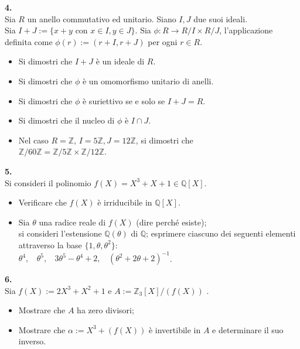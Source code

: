 \documentclass[italian,a4paper,11pt]
{article}
\newcommand{\Q}{\mathbb{Q}}
\newcommand{\Z}{\mathbb Z}
\newcommand{\acc}{\`}
\begin{document}
\vspace{0.4 cm}
\noindent
\begin{Ex}\textbf{ 4.}\\
Sia $R$ un anello commutativo ed unitario. Siano $I,J$ due suoi ideali.\\
Sia $I + J := \{x + y$ con $x \in I, y \in J\}$. Sia $\phi : R\longrightarrow R/I \times R/J$, l'applicazione definita come $\phi(r):= (r + I, r + J)$ per ogni $r\in R$.
\begin{itemize}
\item Si dimostri che $I + J$ \acc e un ideale di $R$.
\item Si dimostri che $\phi$ \acc e un omomorfismo unitario di anelli.
\item Si dimostri che $\phi$ \acc e suriettivo se e solo se $I + J = R$.
\item Si dimostri che il nucleo di $\phi$ \acc e $I\cap J$.
\item Nel caso $R = \Z$, $I = 5\Z, J = 12\Z$, si dimostri che\\ $\Z/60\Z = \Z/5\Z \times \Z/12\Z$.
\end{itemize}
\end{Ex}

\vspace{0.4 cm}
\noindent
\begin{Ex}\textbf{ 5.}\\

Si consideri il polinomio $f(X) = X^3 + X + 1 \in \Q[X]$.
\begin{itemize}
\item Verificare che $f(X)$ \acc e irriducibile in $\Q[X]$.
\item Sia $\theta$ una radice reale di $f(X)$ (dire perch\'e esiste); \\ si consideri
l'estensione $\Q(\theta)$ di $\Q$; esprimere ciascuno dei seguenti elementi
attraverso la base $\{1, \theta, \theta ^2\}$:\\
$\theta ^4,\ \ \ \  \theta ^5,\ \ \ \  3\theta ^5 - \theta ^4 + 2,\ \ \ \  (\theta ^2 + 2\theta + 2)^{-1}$.
\end{itemize}

\end{Ex}


\vspace{0.4 cm}
\noindent
\begin{Ex}\textbf{ 6.}\\
Sia $f(X) := 2X^3 + X^2 + 1$ e $A := \Z_3[X]/(f(X))$ .
\begin{itemize}
\item Mostrare che $A$ ha zero divisori;
\item Mostrare che $\alpha := X^3 + (f(X))$ \acc e invertibile in $A$ e determinare il
suo inverso.
\end{itemize}
\end{Ex}
\end{document}
